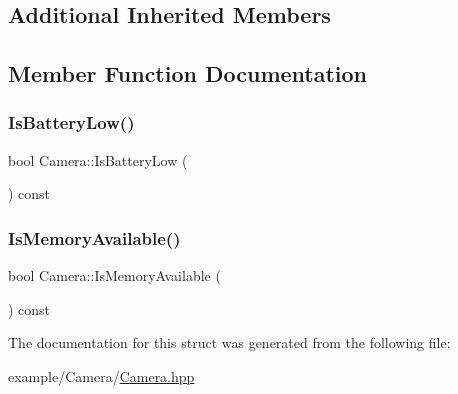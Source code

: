 \subsection*{Additional Inherited Members}


\subsection{Member Function Documentation}
\mbox{\label{struct_camera_a1c08df3b24d4fddfb098f667b562388e}} 
\subsubsection{\texorpdfstring{Is\+Battery\+Low()}{IsBatteryLow()}}
{\footnotesize\ttfamily bool Camera\+::\+Is\+Battery\+Low (\begin{DoxyParamCaption}{ }\end{DoxyParamCaption}) const\hspace{0.3cm}{\ttfamily [inline]}}

\mbox{\label{struct_camera_ab1b02870623f49f0fe23dbcaad3b1996}} 
\subsubsection{\texorpdfstring{Is\+Memory\+Available()}{IsMemoryAvailable()}}
{\footnotesize\ttfamily bool Camera\+::\+Is\+Memory\+Available (\begin{DoxyParamCaption}{ }\end{DoxyParamCaption}) const\hspace{0.3cm}{\ttfamily [inline]}}



The documentation for this struct was generated from the following file\+:\begin{DoxyCompactItemize}
\item 
example/\+Camera/\mbox{\hyperlink{_camera_8hpp}{Camera.\+hpp}}\end{DoxyCompactItemize}
